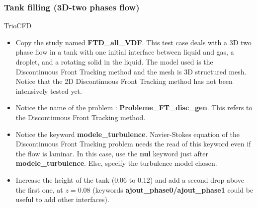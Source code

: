 \documentclass[10pt]{beamer}
\begin{document}
\begin{frame}
\frametitle{Tank filling (3D-two phases flow)}
\begin{block}{TrioCFD}

\begin{itemize}
\item Copy the study named \textbf{FTD\_all\_VDF}. This test case deals with a 3D two phase flow in a tank with one initial interface between liquid and gas, a droplet, and a rotating solid in the liquid. The model used is the Discontinuous Front Tracking method and the mesh is 3D structured mesh. Notice that the 2D Discontinuous Front Tracking method has not been intensively tested yet.

\item Notice the name of the problem : \textbf{Probleme\_FT\_disc\_gen}. This refers to the Discontinuous Front Tracking method.

\item Notice the keyword \textbf{modele\_turbulence}. Navier-Stokes equation of the Discontinuous Front Tracking problem needs the read of this keyword even if the flow is laminar. In this case, use the \textbf{nul} keyword just after \textbf{modele\_turbulence}. Else, specify the turbulence model chosen.

\item Increase the height of the tank (0.06 to 0.12) and add a second drop above the first one, at $z=0.08$ (keywords \textbf{ajout\_phase0/ajout\_phase1} could be useful to add other interfaces).
\end{itemize}

\end{block}
\end{frame}
\end{document}
